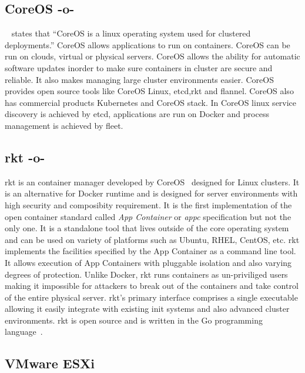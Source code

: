 \subsection{CoreOS -o-}
~\cite{www-core} states that ``CoreOS is a linux operating system used
for clustered deployments.'' CoreOS allows applications to run on
containers. CoreOS can be run on clouds, virtual or physical
servers. CoreOS allows the ability for automatic software updates
inorder to make sure containers in cluster are secure and reliable. It
also makes managing large cluster environments easier. CoreOS provides
open source tools like CoreOS Linux, etcd,rkt and flannel. CoreOS also
has commercial products Kubernetes and CoreOS stack. In CoreOS linux
service discovery is achieved by etcd, applications are run on Docker
and process management is achieved by fleet.

\subsection{rkt -o-}

rkt is an container manager developed by CoreOS~\cite{www-CoreOS}
designed for Linux clusters. It is an alternative for Docker runtime
and is designed for server environments with high security and
composibity requirement. It is the first implementation of the open
container standard called \textit{App Container} or \textit{appc}
specification but not the only one.  It is a standalone tool that
lives outside of the core operating system and can be used on variety
of platforms such as Ubuntu, RHEL, CentOS, etc. rkt implements the
facilities specified by the App Container as a command line tool. It
allows execution of App Containers with pluggable isolation and also
varying degrees of protection. Unlike Docker, rkt runs containers as
un-priviliged users making it impossible for attackers to break out of
the containers and take control of the entire physical server. rkt's
primary interface comprises a single executable allowing it easily
integrate with existing init systems and also advanced cluster
environments. rkt is open source and is written in the Go programming
language~\cite{www-github/rkt}.

     
\subsection{VMware ESXi}

